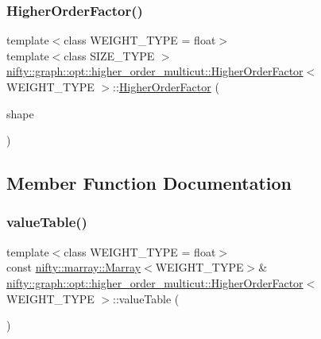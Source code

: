 \subsubsection{\texorpdfstring{Higher\+Order\+Factor()}{HigherOrderFactor()}}
{\footnotesize\ttfamily template$<$class W\+E\+I\+G\+H\+T\+\_\+\+T\+Y\+PE  = float$>$ \\
template$<$class S\+I\+Z\+E\+\_\+\+T\+Y\+PE $>$ \\
\hyperlink{classnifty_1_1graph_1_1opt_1_1higher__order__multicut_1_1HigherOrderFactor}{nifty\+::graph\+::opt\+::higher\+\_\+order\+\_\+multicut\+::\+Higher\+Order\+Factor}$<$ W\+E\+I\+G\+H\+T\+\_\+\+T\+Y\+PE $>$\+::\hyperlink{classnifty_1_1graph_1_1opt_1_1higher__order__multicut_1_1HigherOrderFactor}{Higher\+Order\+Factor} (\begin{DoxyParamCaption}\item[{std\+::initializer\+\_\+list$<$ S\+I\+Z\+E\+\_\+\+T\+Y\+PE $>$}]{shape }\end{DoxyParamCaption})\hspace{0.3cm}{\ttfamily [inline]}}



\subsection{Member Function Documentation}
\mbox{\label{classnifty_1_1graph_1_1opt_1_1higher__order__multicut_1_1HigherOrderFactor_a7425d7771d442ab8d8526de2f978eb0f}} 
\subsubsection{\texorpdfstring{value\+Table()}{valueTable()}}
{\footnotesize\ttfamily template$<$class W\+E\+I\+G\+H\+T\+\_\+\+T\+Y\+PE  = float$>$ \\
const \hyperlink{classandres_1_1Marray}{nifty\+::marray\+::\+Marray}$<$W\+E\+I\+G\+H\+T\+\_\+\+T\+Y\+PE$>$\& \hyperlink{classnifty_1_1graph_1_1opt_1_1higher__order__multicut_1_1HigherOrderFactor}{nifty\+::graph\+::opt\+::higher\+\_\+order\+\_\+multicut\+::\+Higher\+Order\+Factor}$<$ W\+E\+I\+G\+H\+T\+\_\+\+T\+Y\+PE $>$\+::value\+Table (\begin{DoxyParamCaption}{ }\end{DoxyParamCaption})\hspace{0.3cm}{\ttfamily [inline]}}



